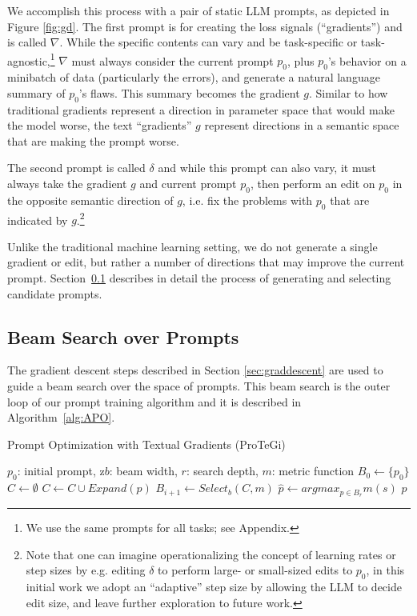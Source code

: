 We accomplish this process with a pair of static LLM prompts, as depicted in Figure \ref{fig:gd}. The first prompt is for creating the loss signals (``gradients'') and is called $\nabla$. While the specific contents can vary and be task-specific or task-agnostic,\footnote{We use the same prompts for all tasks; see Appendix.} $\nabla$ must always consider the current prompt $p_0$, plus $p_0$'s behavior on a minibatch of data (particularly the errors), and generate a natural language summary of $p_0$'s flaws. This summary becomes the gradient $g$. Similar to how traditional gradients represent a direction in parameter space that would make the model worse, the text ``gradients'' $g$ represent directions in a semantic space that are making the prompt worse. 

The second prompt is called $\delta$ and while this prompt can also vary, it must always take the gradient $g$ and current prompt $p_0$, then perform an edit on $p_0$ in the opposite semantic direction of $g$, i.e. fix the problems with $p_0$ that are indicated by $g$.\footnote{Note that one can imagine operationalizing the concept of learning rates or step sizes by e.g. editing $\delta$ to perform large- or small-sized edits to $p_0$, in this initial work we adopt an ``adaptive'' step size by allowing the LLM to decide edit size, and leave further exploration to future work.}

Unlike the traditional machine learning setting, we do not generate a single gradient or edit, but rather a number of directions that may improve the current prompt.
Section~\ref{sec:beamsearch} describes in detail the process of generating and selecting candidate prompts.

\subsection{Beam Search over Prompts}
\label{sec:beamsearch}

The gradient descent steps described in Section \ref{sec:graddescent} are used to guide a beam search over the space of prompts. This beam search is the outer loop of our prompt training algorithm and it is described in Algorithm~\ref{alg:APO}.

\begin{algorithm}
\caption{Prompt Optimization with Textual Gradients (ProTeGi)}
\label{alg:APO}
\begin{algorithmic}[1]
\REQUIRE $p_0$: initial prompt, z$b$: beam width, $r$: search depth, $m$: metric function
\STATE $B_0 \leftarrow \{p_0\}$
    \STATE $C \leftarrow \emptyset$
        \STATE $C \leftarrow C \cup Expand(p)$
    \ENDFOR
    \STATE $B_{i+1} \leftarrow Select_b(C, m)$
\ENDFOR
\STATE $\hat{p} \leftarrow argmax_{p \in B_r} m(s)$
\RETURN $\hat{p}$
\end{algorithmic}
\end{algorithm}

